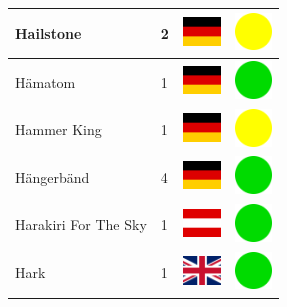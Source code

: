 \documentclass[12pt, a4paper, twoside]{report}
\begin{document}
\begin{center}
\begin{longtable}{|p{5cm}|p{2cm}|p{2cm}|p{2cm}|}
			Hailstone & 2 & \includegraphics[width=1cm]{4x3/de} & \includegraphics[width=1cm]{likes/m} \\ \hline
			Hämatom & 1 & \includegraphics[width=1cm]{4x3/de} & \includegraphics[width=1cm]{likes/y} \\ \hline
			Hammer King & 1 & \includegraphics[width=1cm]{4x3/de} & \includegraphics[width=1cm]{likes/m} \\ \hline
			Hängerbänd & 4 & \includegraphics[width=1cm]{4x3/de} & \includegraphics[width=1cm]{likes/y} \\ \hline
			Harakiri For The Sky & 1 & \includegraphics[width=1cm]{4x3/at} & \includegraphics[width=1cm]{likes/y} \\ \hline
			Hark & 1 & \includegraphics[width=1cm]{4x3/gb} & \includegraphics[width=1cm]{likes/y} \\ \hline

\end{longtable}
\end{center}
\end{document}
